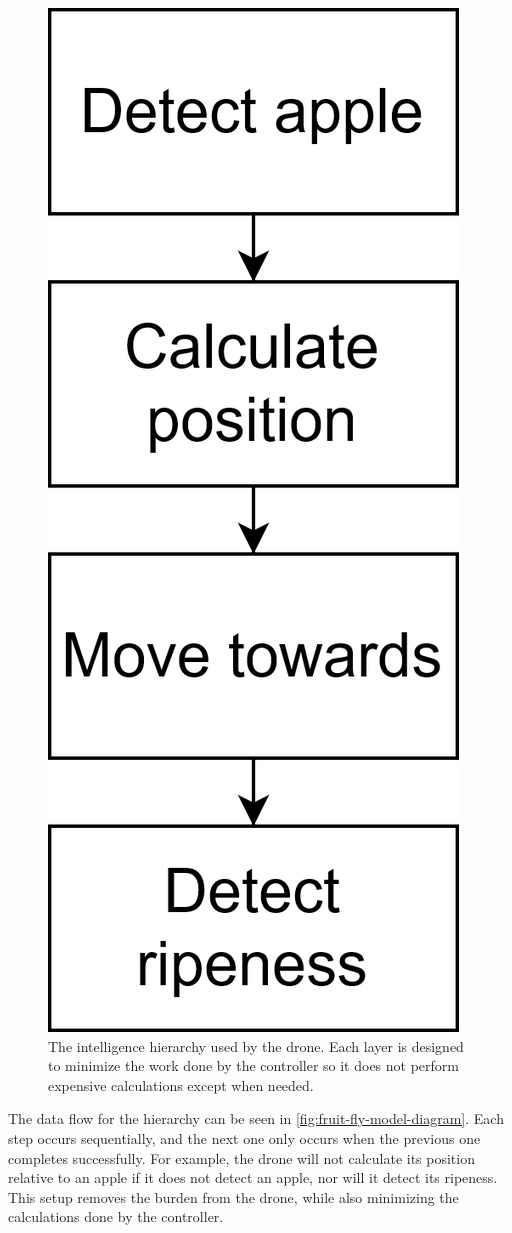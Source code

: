 \begin{figure}[!htb]
    \fontsize{7}{5}\selectfont
    \centering
    \includegraphics[scale=0.8]
    {./figures/intelligence-hierarchy}
    \caption{
        The intelligence hierarchy used by the drone.
        Each layer is designed to minimize the work done by the controller so it does not perform expensive calculations except when needed.
    }
    \label{fig:intelligence-hierarchy}
\end{figure}
The data flow for the hierarchy can be seen in \autoref{fig:fruit-fly-model-diagram}.
Each step occurs sequentially, and the next one only occurs when the previous one completes successfully.
For example, the drone will not calculate its position relative to an apple if it does not detect an apple, nor will it detect its ripeness.
This setup removes the burden from the drone, while also minimizing the calculations done by the controller.

